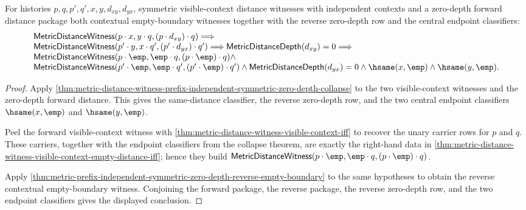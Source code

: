 \begin{theorem}
\label{thm:metric-prefix-independent-symmetric-zero-depth-two-sided-empty-boundary-package}
\label{thm:metric-prefix-independent-symmetric-zero-depth-two-sided-empty-boundary}
For histories $p,q,p',q',x,y,d_{xy},d_{yx}$, symmetric visible-context
distance witnesses with independent contexts and a zero-depth forward distance
package both contextual empty-boundary witnesses together with the reverse
zero-depth row and the central endpoint classifiers:
$$
\begin{array}{l}
\mathsf{MetricDistanceWitness}(p\cdot x,y\cdot q,(p\cdot d_{xy})\cdot q)
\Longrightarrow
\\
\mathsf{MetricDistanceWitness}(p'\cdot y,x\cdot q',(p'\cdot d_{yx})\cdot q')
\Longrightarrow
\mathsf{MetricDistanceDepth}(d_{xy})=0
\Longrightarrow
\\
\mathsf{MetricDistanceWitness}(p\cdot\emp,\emp\cdot q,
(p\cdot\emp)\cdot q)\land
\\
\mathsf{MetricDistanceWitness}(p'\cdot\emp,\emp\cdot q',
(p'\cdot\emp)\cdot q')\land
\mathsf{MetricDistanceDepth}(d_{yx})=0\land
\hsame(x,\emp)\land\hsame(y,\emp).
\end{array}
$$
\end{theorem}
\begin{proof}
Apply
\autoref{thm:metric-distance-witness-prefix-independent-symmetric-zero-depth-collapse}
to the two visible-context witnesses and the zero-depth forward distance. This
gives the same-distance classifier, the reverse zero-depth row, and the two
central endpoint classifiers $\hsame(x,\emp)$ and $\hsame(y,\emp)$.

Peel the forward visible-context witness with
\autoref{thm:metric-distance-witness-visible-context-iff} to recover the unary
carrier rows for $p$ and $q$. These carriers, together with the endpoint
classifiers from the collapse theorem, are exactly the right-hand data in
\autoref{thm:metric-distance-witness-visible-context-empty-distance-iff};
hence they build
$\mathsf{MetricDistanceWitness}(p\cdot\emp,\emp\cdot q,(p\cdot\emp)\cdot q)$.

Apply
\autoref{thm:metric-prefix-independent-symmetric-zero-depth-reverse-empty-boundary}
to the same hypotheses to obtain the reverse contextual empty-boundary witness.
Conjoining the forward package, the reverse package, the reverse zero-depth
row, and the two endpoint classifiers gives the displayed conclusion.
\end{proof}

